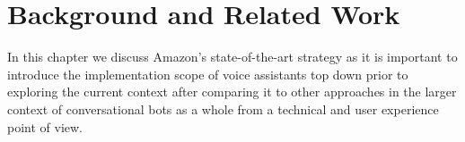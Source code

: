 

\chapter{Background and Related Work}
\label{relatedWork} 




In this chapter we discuss Amazon's state-of-the-art strategy
as it is important to introduce the implementation scope of voice assistants 
top down
prior to exploring the current context 
after comparing it to other approaches in the larger context of conversational bots as a whole from a technical and user experience point of view. 












